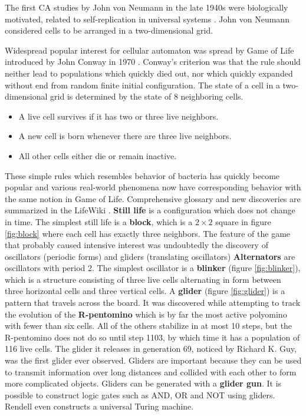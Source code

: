The first CA studies by John von Neumann in the late 1940s were biologically motivated, related to self-replication in universal systems \cite{Neumann66Cellular}. John von Neumann considered cells to be arranged in a two-dimensional grid.

Widespread popular interest for cellular automaton was spread by Game of Life introduced by John Conway in 1970 \cite{Gardner70Life}. Conway’s criterion was that the rule should neither lead to populations which quickly died out, nor which quickly expanded without end from random finite initial configuration. The state of a cell in a two-dimensional grid is determined by the state of 8 neighboring cells.

\begin{itemize}
  \item A live cell survives if it has two or three live neighbors.
  \item A new cell is born whenever there are three live neighbors.
  \item All other cells either die or remain inactive.
\end{itemize}

These simple rules which resembles behavior of bacteria has quickly become popular and various real-world phenomena now have corresponding behavior with the same notion in Game of Life. Comprehensive glossary and new discoveries are summarized in the LifeWiki \cite{LifeWiki}.
{\bf Still life} is a configuration which does not change in time. The simplest still life is a {\bf block}, which is a $2\times 2$ square in figure \ref{fig:block} where each cell has exactly three neighbors.
The feature of the game that probably caused intensive interest was undoubtedly the discovery of oscillators (periodic forms) and gliders (translating oscillators)
{\bf Alternators} are oscillators with period 2. The simplest oscillator is a {\bf blinker} (figure \ref{fig:blinker}), which is a structure consisting of three live cells alternating in form between three horizontal cells and three vertical cells.
A {\bf glider} (figure \ref{fig:glider}) is a pattern that travels across the board. It was discovered while attempting to track the evolution of the {\bf R-pentomino} which is by far the most active polyomino with fewer than six cells. All of the others stabilize in at most 10 steps, but the R-pentomino does not do so until step 1103, by which time it has a population of 116 live cells. The glider it releases in generation 69, noticed by Richard K. Guy, was the first glider ever observed. Gliders are important because they can be used to transmit information over long distances and collided with each other to form more complicated objects. Gliders can be generated with a {\bf glider gun}. It is possible to construct logic gates such as AND, OR and NOT using gliders. Rendell \cite{Rendell15LifeUniversal} even constructs a universal Turing machine.

